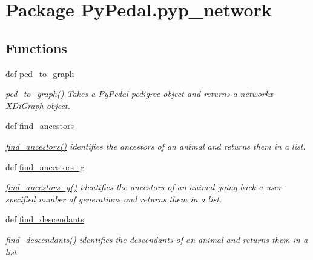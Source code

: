 \hypertarget{namespacePyPedal_1_1pyp__network}{
\section{Package Py\-Pedal.pyp\_\-network}
\label{namespacePyPedal_1_1pyp__network}
}


\subsection*{Functions}
\begin{CompactItemize}
\item 
def \hyperlink{namespacePyPedal_1_1pyp__network_800efc2cc1a885abd2d4af54f9dc38d5}{ped\_\-to\_\-graph}
\begin{CompactList}\small\item\em \hyperlink{namespacePyPedal_1_1pyp__network_800efc2cc1a885abd2d4af54f9dc38d5}{ped\_\-to\_\-graph()} Takes a Py\-Pedal pedigree object and returns a networkx XDi\-Graph object. \item\end{CompactList}\item 
def \hyperlink{namespacePyPedal_1_1pyp__network_3e638a2ecefb9a7a010490534e8c5cd3}{find\_\-ancestors}
\begin{CompactList}\small\item\em \hyperlink{namespacePyPedal_1_1pyp__network_3e638a2ecefb9a7a010490534e8c5cd3}{find\_\-ancestors()} identifies the ancestors of an animal and returns them in a list. \item\end{CompactList}\item 
def \hyperlink{namespacePyPedal_1_1pyp__network_e525dea748cda15e194c437134842016}{find\_\-ancestors\_\-g}
\begin{CompactList}\small\item\em \hyperlink{namespacePyPedal_1_1pyp__network_e525dea748cda15e194c437134842016}{find\_\-ancestors\_\-g()} identifies the ancestors of an animal going back a user-specified number of generations and returns them in a list. \item\end{CompactList}\item 
def \hyperlink{namespacePyPedal_1_1pyp__network_868b8569bf54f00cdc197ed911082cc2}{find\_\-descendants}
\begin{CompactList}\small\item\em \hyperlink{namespacePyPedal_1_1pyp__network_868b8569bf54f00cdc197ed911082cc2}{find\_\-descendants()} identifies the descendants of an animal and returns them in a list. \item\end{CompactList}\item 

\end{CompactItemize}
